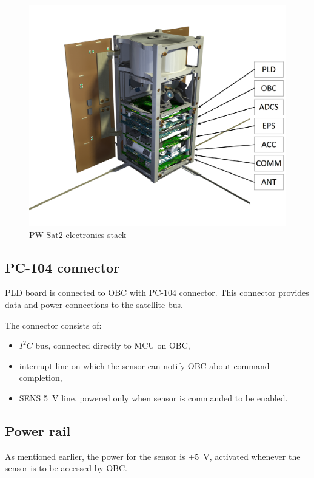         \begin{figure}[H]
            \centering
            \includegraphics[width=0.7\paperwidth]{img/04/PW-Sat2-stack.png}
            \caption{PW-Sat2 electronics stack}
            \label{PW-Sat2_stack}
        \end{figure}

    \subsection{PC-104 connector}
        PLD board is connected to OBC with PC-104 connector. This connector provides data and power connections to the satellite bus.

        The connector consists of:
        \begin{itemize}
            \item $I^2C$ bus, connected directly to MCU on OBC,
            \item interrupt line on which the sensor can notify OBC about command completion,
            \item SENS \SI{5}{\volt} line, powered only when sensor is commanded to be enabled.
        \end{itemize}

    \subsection{Power rail}
        As mentioned earlier, the power for the sensor is +\SI{5}{\volt}, activated whenever the sensor is to be accessed by OBC.

